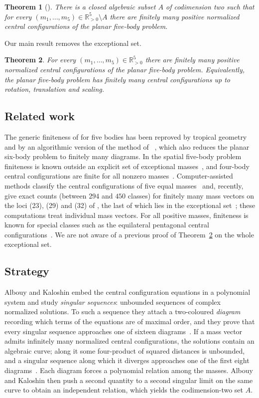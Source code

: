 \documentclass[11pt]{amsart}
\newtheorem{theorem}{Theorem}[section]
\theoremstyle{definition}
\theoremstyle{remark}
\newcommand{\Rp}{\mathbb{R}_{>0}}
\begin{document}
\begin{theorem}[{\cite[Thm.~2]{AK}}]
There is a closed algebraic subset $A$ of codimension two such that for every
$(m_1,\dots,m_5)\in\Rp^5\setminus A$ there are finitely many positive normalized central
configurations of the planar five-body problem.
\end{theorem}
Our main result removes the exceptional set.

\begin{theorem}\label{thm:main}
For every $(m_1,\dots,m_5)\in\Rp^5$ there are finitely many positive normalized central
configurations of the planar five-body problem.  Equivalently, the planar five-body problem
has finitely many central configurations up to rotation, translation and scaling.
\end{theorem}

\subsection*{Related work}
The generic finiteness of \cite{AK} for five bodies has been reproved by tropical
geometry~\cite{JL} and by an algorithmic version of the method of \cite{AK}~\cite{CC1,CC2},
which also reduces the planar six-body problem to finitely many diagrams.  In the spatial
five-body problem finiteness is known outside an explicit set of exceptional
masses~\cite{HJ}, and four-body central configurations are finite for all nonzero
masses~\cite{YZ}.  Computer-assisted methods classify the central configurations of five equal
masses~\cite{LS,MZ19} and, recently, give exact counts (between $294$ and $450$ classes) for
finitely many mass vectors on the loci (23), (29) and (32) of \cite[\S8]{AK}, the last of which
lies in the exceptional set~\cite{MZ26}; these computations treat individual mass vectors.
For all positive masses, finiteness is known for special classes such as the equilateral
pentagonal central configurations~\cite{DH}.  We are not aware of a previous proof of
Theorem~\ref{thm:main} on the whole exceptional set.

\subsection*{Strategy}
Albouy and Kaloshin embed the central configuration equations in a polynomial system and
study \emph{singular sequences}: unbounded sequences of complex normalized solutions.  To such a
sequence they attach a two-coloured \emph{diagram} recording which terms of the equations are
of maximal order, and they prove that every singular sequence approaches one of sixteen
diagrams~\cite[Fig.~11]{AK}.  If a mass vector admits infinitely many normalized central
configurations, the solutions contain an algebraic curve; along it some four-product of squared
distances is unbounded, and a singular sequence along which it diverges approaches one of the
first eight diagrams~\cite[Props.~8--9 and proof of Thm.~6]{AK}.  Each diagram forces a polynomial
relation among the masses.  Albouy and Kaloshin then push a second quantity to a second singular
limit on the same curve to obtain an independent relation, which yields the codimension-two set
$A$.
\end{document}
